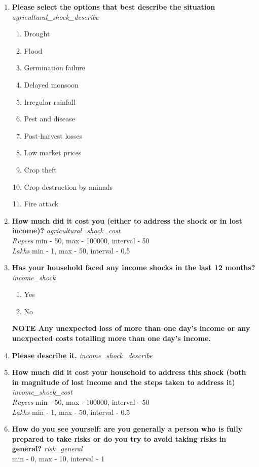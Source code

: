 \documentclass{article}
\begin{document}
\begin{enumerate}
\item {\bfseries Please select the options that best describe the situation}\emph{ agricultural\_shock\_describe } 
\begin{enumerate} 
\item Drought 
\item Flood 
\item Germination failure 
\item Delayed monsoon 
\item Irregular rainfall 
\item Pest and disease 
\item Post-harvest losses 
\item Low market prices 
\item Crop theft 
\item Crop destruction by animals 
\item Fire attack 
\end{enumerate} 
\item {\bfseries How much did it cost you (either to address the shock or in lost income)?}\emph{ agricultural\_shock\_cost } 
\\ \emph{ Rupees }min - 50, max - 100000, interval - 50 
\\ \emph{ Lakhs }min - 1, max - 50, interval - 0.5 
 
\item {\bfseries Has your household faced any income shocks in the last 12 months?}\emph{ income\_shock } 
\begin{enumerate} 
\item Yes 
\item No 
\end{enumerate}\textbf{{\footnotesize NOTE} Any unexpected loss of more than one day's income or any unexpected costs totalling more than one day's income. } 
 
\item {\bfseries Please describe it.}\emph{ income\_shock\_describe } 
 
\item {\bfseries How much did it cost your household to address this shock (both in magnitude of lost income and the steps taken to address it)}\emph{ income\_shock\_cost } 
\\ \emph{ Rupees }min - 50, max - 100000, interval - 50 
\\ \emph{ Lakhs }min - 1, max - 50, interval - 0.5 
 
\item {\bfseries How do you see yourself: are you generally a person who is fully prepared to take risks or do you try to avoid taking risks in general?}\emph{ risk\_general } 
\\min - 0, max - 10, interval - 1 
 

\end{enumerate}
\end{document}
